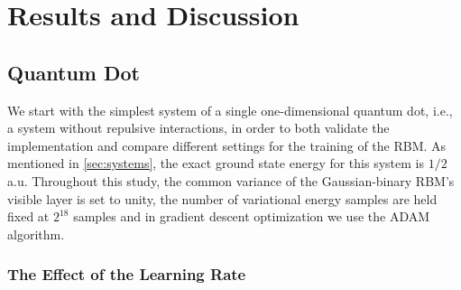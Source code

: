 \section{Results and Discussion}\label{sec:Results}

\subsection{Quantum Dot}

We start with the simplest system of a single one-dimensional quantum dot, i.e., a system without repulsive interactions, in order to both validate the implementation and compare different settings for the training of the RBM. As mentioned in \autoref{sec:systems}, the exact ground state energy for this system is $1/2$ a.u. Throughout this study, the common variance of the Gaussian-binary RBM's visible layer is set to unity, the number of variational energy samples are held fixed at $2^{18}$ samples and in gradient descent optimization we use the ADAM algorithm.

\subsubsection*{The Effect of the Learning Rate}


